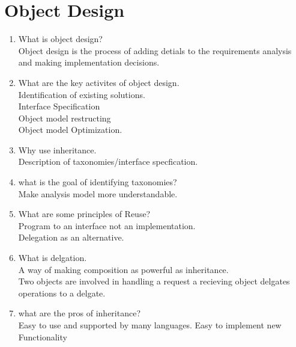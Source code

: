\documentclass[10pt]{article}
\begin{document}
\section{Object Design}
\begin{enumerate}
      \item What is object design?\\

            Object design is the process of adding detials to the requirements analysis and making implementation decisions.\\

      \item What are the key activites of object design.\\
            Identification of existing solutions.\\
            Interface Specification\\
            Object model restructing\\
            Object model Optimization.\\

      \item Why use inheritance.\\
            Description of taxonomies/interface specfication.\\

      \item what is the goal of identifying taxonomies?\\
            Make analysis model more understandable.\\

      \item What are some principles of Reuse?\\
            Program to an interface not an implementation.\\
            Delegation as an alternative.\\

      \item What is delgation.\\
            A way of making composition as powerful as inheritance.\\

            Two objects are involved in handling a request a recieving object delgates operations to a delgate.\\

      \item what are the pros of inheritance?\\
            Easy to use and supported by many languages. Easy to implement new Functionality\\


\end{enumerate}
\end{document}
